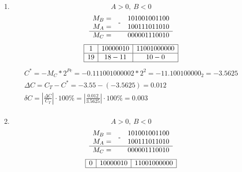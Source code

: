 \documentclass{article}
\begin{document}
\begin{enumerate}
\begin{enumerate}
                    \item $$ A > 0,\ B < 0 $$
                          $$ 
                                 \begin{array}{rcr}
                                        M_B = & \MINUS & 101001001100     \\
                                        M_A = &        & 100111011010 \nl
                                        M_C = &        & 000001110010    \\
                                 \end{array}
                          $$$$
                                 \begin{array}{|c|c|c|}
                                        \hline
                                        1  & 10000010 & 11001000000 \nl
                                        19 & 18-11    & 10-0 \nl
                                 \end{array}
                          $$$$
                                 \begin{array}{c}
                                        C^*      = -M_C * 2^{Pc} = -0.11100100000{2} * 2^{2} = -11.100100000_{2}  = -3.5625                              \\
                                        \Delta C = C_T - C^* = -3.55 - (-3.5625) = 0.012                                                                  \\
                                        \delta C = \left|\frac{\Delta C}{C_T}\right| \cdot 100\% = \left|\frac{0.012}{3.5625 }\right| \cdot 100\% = 0.003 \\
                                 \end{array}
                          $$
                     \item $$ A > 0,\ B < 0 $$
                          $$ 
                                 \begin{array}{rcr}
                                        M_B = & \MINUS & 101001001100     \\
                                        M_A = &        & 100111011010 \nl
                                        M_C = &        & 000001110010    \\
                                 \end{array}
                          $$$$
                                 \begin{array}{|c|c|c|}
                                        \hline
                                        0  & 10000010 & 11001000000 \nl

\end{array}$$
\end{enumerate}
\end{enumerate}
\end{document}
